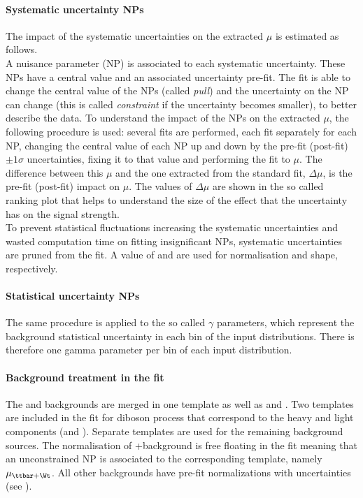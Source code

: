 \paragraph{Systematic uncertainty NPs} The impact of the systematic
uncertainties on the extracted $\mu$ is estimated as follows. \\
A nuisance parameter (NP) is associated to each systematic uncertainty.
These NPs have a central value and an associated uncertainty pre-fit.
The fit is able to change the central value of the NPs (called \textit{pull})
and the uncertainty on the NP can change (this is called \textit{constraint}
if the uncertainty becomes smaller), to better describe the data.
To understand the impact of the NPs on the extracted $\mu$, the
following procedure is used:
several fits are performed, each fit separately for each NP,
changing the central value of each NP up and down by the pre-fit
(post-fit) $\pm 1 \sigma$ uncertainties,
fixing it to that value and performing the fit to $\mu$.
The difference between this $\mu$ and the one extracted from the
standard fit, $\Delta\mu$, is the pre-fit (post-fit) impact on $\mu$.
The values of $\Delta\mu$ are shown in the so called ranking plot that 
helps to understand the size of the effect that
the uncertainty has on the signal strength. \\
To prevent statistical fluctuations increasing the systematic uncertainties
and wasted computation time on fitting insignificant NPs,
systematic uncertainties are pruned from the fit. 
A value of \prunenorm and \pruneshape are used for normalisation and shape, respectively. 

\paragraph{Statistical uncertainty NPs} The same procedure is applied
to the so called $\gamma$ parameters, which represent the background
statistical uncertainty in each bin of the input distributions.
There is therefore one gamma parameter per bin of each input distribution. 

\paragraph{Background treatment in the fit} The \ttZ and \tWZ backgrounds are merged in one template as well as
\ttbar and \Wt. Two templates are included in the fit for diboson process that correspond to the heavy and light components (\VVHF and \VVLF).
Separate templates are used for the remaining background sources.
The normalisation of \ttbar+\Wt background is free floating in the fit meaning that an unconstrained NP is associated to the corresponding template, namely $\mu_{\ttbar+\Wt}$.
All other backgrounds have pre-fit normalizations with uncertainties (see ).

